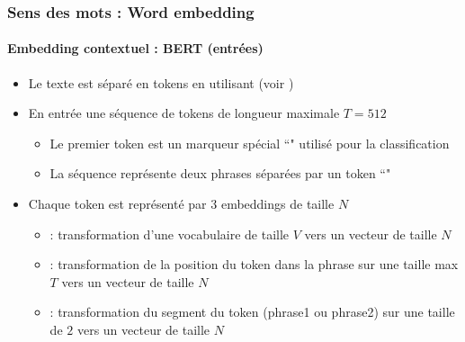 \documentclass[xcolor=table]{beamer}
\begin{document}
\begin{frame}
\frametitle{Sens des mots : Word embedding}
\framesubtitle{Embedding contextuel : BERT (entrées)}
	
\begin{itemize}
	\item Le texte est séparé en tokens en utilisant  (voir \cite{2016-wu-al})
	\item En entrée une séquence de tokens de longueur maximale $T = 512$
	\begin{itemize}
		\item Le premier token est un marqueur spécial ``\keyword{[CLS]}" utilisé pour la classification
		\item La séquence représente deux phrases séparées par un token ``\keyword{[SEP]}"
	\end{itemize}
	\item Chaque token est représenté par 3 embeddings de taille $N$ 
	\begin{itemize}
		\item {} : transformation d'une vocabulaire de taille $V$ vers un vecteur de taille $N$
		\item {} : transformation de la position du token dans la phrase sur une taille max $T$ vers un vecteur de taille $N$
		\item {} : transformation du segment du token (phrase1 ou phrase2) sur une taille de $2$ vers un vecteur de taille $N$
	\end{itemize}
\end{itemize}
	
\end{frame}
\end{document}
